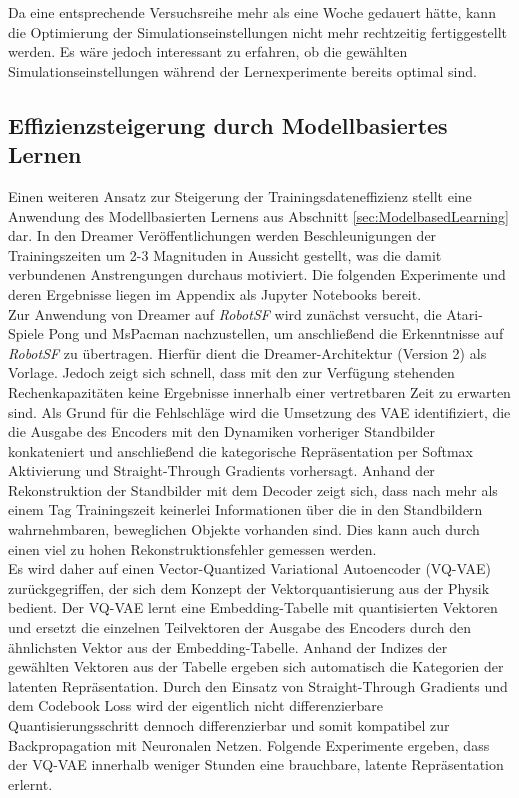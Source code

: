 Da eine entsprechende Versuchsreihe mehr als eine Woche gedauert hätte, kann die
Optimierung der Simulationseinstellungen nicht mehr rechtzeitig fertiggestellt werden.
Es wäre jedoch interessant zu erfahren, ob die gewählten Simulationseinstellungen
während der Lernexperimente bereits optimal sind.

\subsection{Effizienzsteigerung durch Modellbasiertes Lernen}
Einen weiteren Ansatz zur Steigerung der Trainingsdateneffizienz stellt eine Anwendung
des Modellbasierten Lernens aus Abschnitt \ref{sec:ModelbasedLearning} dar. In den Dreamer
Veröffentlichungen werden Beschleunigungen der Trainingszeiten um 2-3 Magnituden in Aussicht
gestellt, was die damit verbundenen Anstrengungen durchaus motiviert. Die folgenden
Experimente und deren Ergebnisse liegen im Appendix als Jupyter Notebooks bereit.\\

Zur Anwendung von Dreamer auf \emph{RobotSF} wird zunächst versucht, die Atari-Spiele
Pong und MsPacman nachzustellen, um anschließend die Erkenntnisse auf \emph{RobotSF}
zu übertragen. Hierfür dient die Dreamer-Architektur (Version 2) \cite{hafner2022dreamerv2}
als Vorlage. Jedoch zeigt sich schnell, dass mit den zur Verfügung stehenden Rechenkapazitäten
keine Ergebnisse innerhalb einer vertretbaren Zeit zu erwarten sind. Als Grund für
die Fehlschläge wird die Umsetzung des VAE identifiziert, die die Ausgabe des Encoders
mit den Dynamiken vorheriger Standbilder konkateniert und anschließend die kategorische
Repräsentation per Softmax Aktivierung und Straight-Through Gradients
\cite{bengio2013estimating} vorhersagt. Anhand der Rekonstruktion der Standbilder mit
dem Decoder zeigt sich, dass nach mehr als einem Tag Trainingszeit keinerlei Informationen
über die in den Standbildern wahrnehmbaren, beweglichen Objekte vorhanden sind. Dies kann
auch durch einen viel zu hohen Rekonstruktionsfehler gemessen werden.\\

Es wird daher auf einen Vector-Quantized Variational Autoencoder (VQ-VAE) \cite{oord2018vqvae}
zurückgegriffen, der sich dem Konzept der Vektorquantisierung aus der Physik bedient.
Der VQ-VAE lernt eine Embedding-Tabelle mit quantisierten Vektoren und ersetzt die einzelnen
Teilvektoren der Ausgabe des Encoders durch den ähnlichsten Vektor aus der Embedding-Tabelle.
Anhand der Indizes der gewählten Vektoren aus der Tabelle ergeben sich automatisch
die Kategorien der latenten Repräsentation. Durch den Einsatz von Straight-Through Gradients
und dem Codebook Loss wird der eigentlich nicht differenzierbare Quantisierungsschritt
dennoch differenzierbar und somit kompatibel zur Backpropagation mit Neuronalen Netzen.
Folgende Experimente ergeben, dass der VQ-VAE innerhalb weniger Stunden eine brauchbare,
latente Repräsentation erlernt.\\


